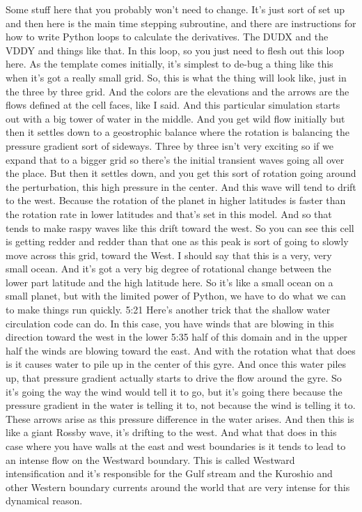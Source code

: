 Some stuff here that you probably won't need to change. It's just sort of set up and then here is the main time stepping subroutine, and there are instructions for how to write Python loops to calculate the derivatives. The DUDX and the VDDY and things like that. In this loop, so you just need to flesh out this loop here. As the template comes initially, it's simplest to de-bug a thing like this when it's got a really small grid. So, this is what the thing will look like, just in the three by three grid. And the colors are the elevations and the arrows are the flows defined at the cell faces, like I said. And this particular simulation starts out with a big tower of water in the middle. And you get wild flow initially but then it settles down to a geostrophic balance where the rotation is balancing the pressure gradient sort of sideways. Three by three isn't very exciting so if we expand that to a bigger grid so there's the initial transient waves going all over the place. But then it settles down, and you get this sort of rotation going around the perturbation, this high pressure in the center. And this wave will tend to drift to the west. Because the rotation of the planet in higher latitudes is faster than the rotation rate in lower latitudes and that's set in this model. And so that tends to make raspy waves like this drift toward the west. So you can see this cell is getting redder and redder than that one as this peak is sort of going to slowly move across this grid, toward the West. I should say that this is a very, very small ocean. And it's got a very big degree of rotational change between the lower part latitude and the high latitude here. So it's like a small ocean on a small planet, but with the limited power of Python, we have to do what we can to make things run quickly. 
5:21
Here's another trick that the shallow water circulation code can do. In this case, you have winds that are blowing in this direction toward the west in the lower 
5:35
half of this domain and in the upper half the winds are blowing toward the east. And with the rotation what that does is it causes water to pile up in the center of this gyre. And once this water piles up, that pressure gradient actually starts to drive the flow around the gyre. So it's going the way the wind would tell it to go, but it's going there because the pressure gradient in the water is telling it to, not because the wind is telling it to. These arrows arise as this pressure difference in the water arises. And then this is like a giant Rossby wave, it's drifting to the west. And what that does in this case where you have walls at the east and west boundaries is it tends to lead to an intense flow on the Westward boundary. This is called Westward intensification and it's responsible for the Gulf stream and the Kuroshio and other Western boundary currents around the world that are very intense for this dynamical reason. 

